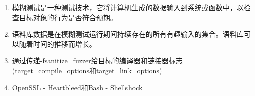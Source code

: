

\begin{enumerate}
\item 
模糊测试是一种测试技术，它将计算机生成的数据输入到系统或函数中，以检查目标对象的行为是否符合预期。

\item
语料库数据是在模糊测试运行期间持续存在的所有有趣输入的集合。语料库可以随着时间的推移而增长。

\item 
通过传递-fsanitize=fuzzer给目标的编译器和链接器标志(target\_compile\_options和target\_link\_options)

\item 
OpenSSL - Heartbleed和Bash - Shellshock
\end{enumerate}